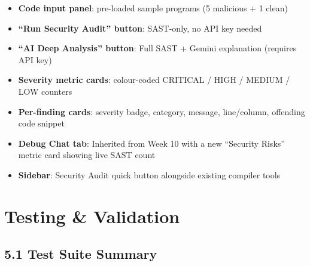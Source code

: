 \documentclass[a4paper,11pt]{article}
\begin{document}
\begin{itemize}[leftmargin=*]
    \item \textbf{Code input panel}: pre-loaded sample programs (5 malicious + 1 clean)
    \item \textbf{``Run Security Audit'' button}: SAST-only, no API key needed
    \item \textbf{``AI Deep Analysis'' button}: Full SAST + Gemini explanation (requires API key)
    \item \textbf{Severity metric cards}: colour-coded CRITICAL / HIGH / MEDIUM / LOW counters
    \item \textbf{Per-finding cards}: severity badge, category, message, line/column, offending code snippet
    \item \textbf{Debug Chat tab}: Inherited from Week 10 with a new ``Security Risks'' metric card showing live SAST count
    \item \textbf{Sidebar}: Security Audit quick button alongside existing compiler tools
\end{itemize}

\section{Testing \& Validation}

\subsection{5.1 Test Suite Summary}
\end{document}
